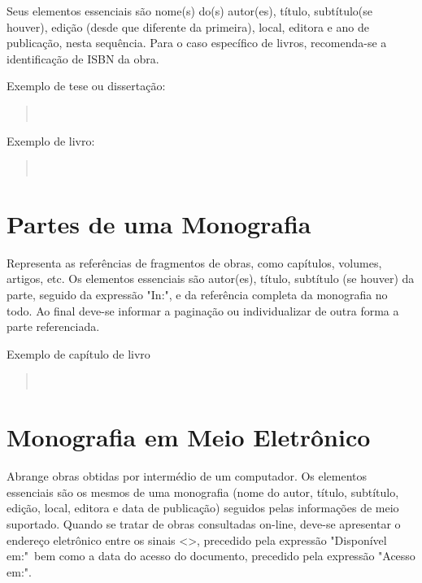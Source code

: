 \documentclass[repeatfields,xlists,xpacks,oneside,yearsonly]{ufrgscca}
\begin{document}
\begin{appendix}
Seus elementos essenciais são nome(s) do(s) autor(es), título, subtítulo(se
houver), edição (desde que diferente da primeira), local, editora e ano de
publicação, nesta sequência. Para o caso específico de livros,
recomenda-se a identificação de ISBN da obra.

Exemplo de tese ou dissertação:\\

\begin{quote}\noindent{}\\\end{quote}

Exemplo de livro:\\

\begin{quote}\noindent{}\\\end{quote}


\section{Partes de uma Monografia}

Representa as referências de fragmentos de obras, como capítulos, volumes,
artigos, etc. Os elementos essenciais são autor(es), título, subtítulo (se
houver) da parte, seguido da expressão "In:", e da referência completa da
monografia no todo. Ao final deve-se informar a paginação ou individualizar
de outra forma a parte referenciada.

Exemplo de capítulo de livro\\

\begin{quote}\noindent{}\\\end{quote}


\section{Monografia em Meio Eletrônico}

Abrange obras obtidas por intermédio de um computador. Os elementos
essenciais são os mesmos de uma monografia (nome do autor, título,
subtítulo, edição, local, editora e data de publicação) seguidos pelas
informações de meio suportado. Quando se tratar de obras consultadas
on-line, deve-se apresentar o endereço eletrônico entre os sinais <>,
precedido pela expressão "Disponível em:"\ bem como a data do acesso do
documento, precedido pela expressão "Acesso em:".


\end{appendix}
\end{document}
